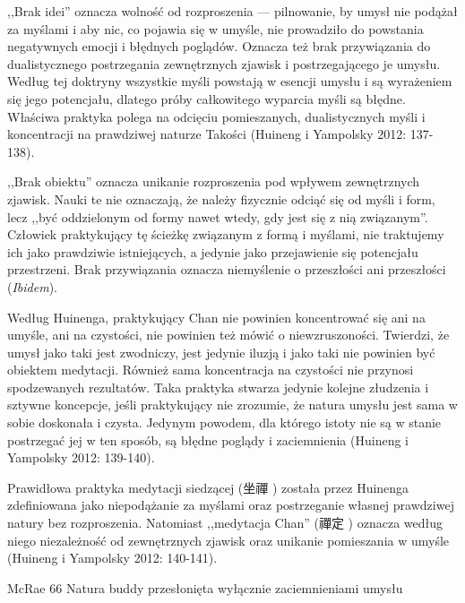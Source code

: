 ,,Brak idei'' oznacza wolność od rozproszenia --- pilnowanie, by umysł nie podążał za myślami i aby nic, co pojawia się w umyśle, nie prowadziło do powstania negatywnych emocji i błędnych poglądów. Oznacza też brak przywiązania do dualistycznego postrzegania zewnętrznych zjawisk i postrzegającego je umysłu. Według tej doktryny wszystkie myśli powstają w esencji umysłu i są wyrażeniem się jego potencjału, dlatego próby całkowitego wyparcia myśli są błędne. Właściwa praktyka polega na odcięciu pomieszanych, dualistycznych myśli i koncentracji na prawdziwej naturze Takości (Huineng i Yampolsky 2012: 137-138).

,,Brak obiektu'' oznacza unikanie rozproszenia pod wpływem zewnętrznych zjawisk. Nauki te nie oznaczają, że należy fizycznie odciąć się od myśli i form, lecz ,,być oddzielonym od formy nawet wtedy, gdy jest się z nią związanym''. Człowiek praktykujący tę ścieżkę związanym z formą i myślami, nie traktujemy ich jako prawdziwie istniejących, a jedynie jako przejawienie się potencjału przestrzeni. Brak przywiązania oznacza niemyślenie o przeszłości ani przeszłości (\textit{Ibidem}).

Według Huinenga, praktykujący Chan nie powinien koncentrować się ani na umyśle, ani na czystości, nie powinien też mówić o niewzruszoności. Twierdzi, że umysł jako taki jest zwodniczy, jest jedynie iluzją i jako taki nie powinien być obiektem medytacji. Również sama koncentracja na czystości nie przynosi spodzewanych rezultatów. Taka praktyka stwarza jedynie kolejne złudzenia i sztywne koncepcje, jeśli praktykujący nie zrozumie, że natura umysłu jest sama w sobie doskonała i czysta. Jedynym powodem, dla którego istoty nie są w stanie postrzegać jej w ten sposób, są błędne poglądy i zaciemnienia (Huineng i Yampolsky 2012: 139-140).

Prawidłowa praktyka medytacji siedzącej (坐禪 ) została przez Huinenga zdefiniowana jako niepodążanie za myślami oraz postrzeganie własnej prawdziwej natury bez rozproszenia. Natomiast ,,medytacja Chan'' (禪定 ) oznacza według niego niezależność od zewnętrznych zjawisk oraz unikanie pomieszania w umyśle (Huineng i Yampolsky 2012: 140-141).

McRae 66
Natura buddy przesłonięta wyłącznie zaciemnieniami umysłu
\fi
